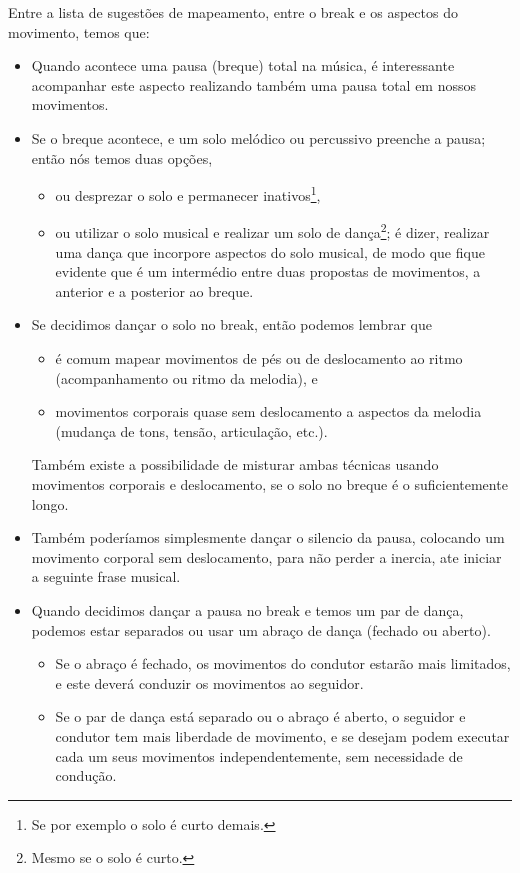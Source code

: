 Entre a lista de sugestões de mapeamento, 
entre o break e os aspectos do movimento, 
temos que:
\begin{itemize}
\item Quando acontece uma pausa (breque) total na música, 
é interessante acompanhar este aspecto realizando também uma pausa total em nossos movimentos.
\item Se o breque acontece,
e um solo melódico ou percussivo preenche a pausa;
então nós temos duas opções, 
\begin{itemize}
\item ou desprezar o solo e permanecer inativos\footnote{Se por exemplo o solo é curto demais.},
\item ou utilizar o solo musical e realizar um solo de dança\footnote{Mesmo se o solo é curto.};
é dizer, realizar uma dança que incorpore aspectos do solo musical,
de modo que fique evidente que é um intermédio entre duas propostas de movimentos,
a anterior e a posterior ao breque.
\end{itemize}
\item Se decidimos dançar o solo no break, 
então podemos lembrar que 
\begin{itemize}
\item é comum mapear movimentos de pés ou de deslocamento ao ritmo 
(acompanhamento ou ritmo da melodia), e 
\item movimentos corporais quase sem deslocamento a aspectos da melodia (mudança de tons, tensão, articulação, etc.).
\end{itemize}
Também existe a possibilidade de misturar ambas técnicas usando movimentos corporais e deslocamento,
se o solo no breque é o suficientemente longo.
\item Também poderíamos simplesmente dançar o silencio da pausa, colocando um movimento corporal sem deslocamento,
para não perder a inercia, ate iniciar a seguinte frase musical.
\item Quando decidimos dançar a pausa no break e temos um par de dança,
podemos estar separados ou usar um abraço de dança (fechado ou aberto).
\begin{itemize}
\item Se o abraço é fechado, os movimentos do condutor estarão mais limitados,
e este deverá conduzir os movimentos ao seguidor.
\item Se o par de dança está separado ou o abraço é aberto, 
o seguidor e condutor tem mais liberdade de movimento,
e se desejam podem executar cada um seus movimentos independentemente,
sem necessidade de condução. 

\end{itemize}
\end{itemize}
